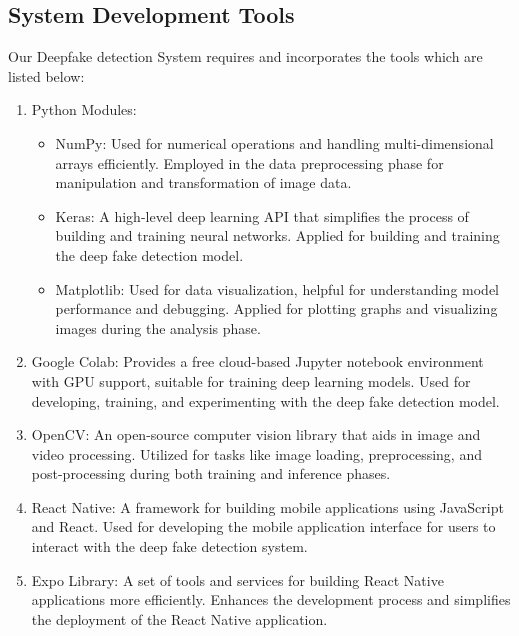 \subsection{System Development Tools}
Our Deepfake detection System requires and incorporates the tools which are listed below:
\begin{enumerate}
    \item Python Modules:
          \begin{itemize}
              \item NumPy:
                    Used for numerical operations and handling multi-dimensional arrays efficiently.
                    Employed in the data preprocessing phase for manipulation and transformation of image data.

              \item Keras:
                    A high-level deep learning API that simplifies the process of building and training neural networks.
                    Applied for building and training the deep fake detection model.

              \item Matplotlib:
                    Used for data visualization, helpful for understanding model performance and debugging.
                    Applied for plotting graphs and visualizing images during the analysis phase.
          \end{itemize}

    \item Google Colab:
          Provides a free cloud-based Jupyter notebook environment with GPU support, suitable for training deep learning models.
          Used for developing, training, and experimenting with the deep fake detection model.

    \item OpenCV:
          An open-source computer vision library that aids in image and video processing.
          Utilized for tasks like image loading, preprocessing, and post-processing during both training and inference phases.

    \item React Native:
          A framework for building mobile applications using JavaScript and React.
          Used for developing the mobile application interface for users to interact with the deep fake detection system.

    \item Expo Library:
          A set of tools and services for building React Native applications more efficiently.
          Enhances the development process and simplifies the deployment of the React Native application.


\end{enumerate}
